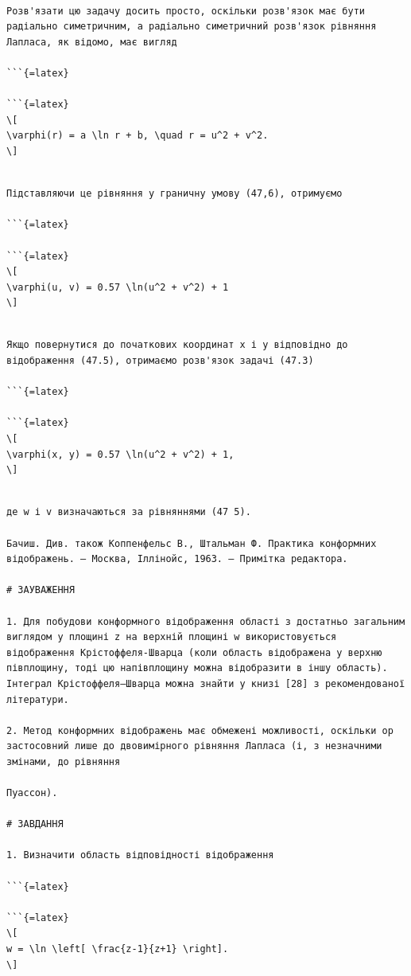 \documentclass[
]{article}
\begin{document}
\begin{verbatim}

Розв'язати цю задачу досить просто, оскільки розв'язок має бути радіально симетричним, а радіально симетричний розв'язок рівняння Лапласа, як відомо, має вигляд

```{=latex}

```{=latex}
\[
\varphi(r) = a \ln r + b, \quad r = u^2 + v^2.
\]
\end{verbatim}

\begin{verbatim}

Підставляючи це рівняння у граничну умову (47,6), отримуємо

```{=latex}

```{=latex}
\[
\varphi(u, v) = 0.57 \ln(u^2 + v^2) + 1
\]
\end{verbatim}

\begin{verbatim}

Якщо повернутися до початкових координат x і y відповідно до відображення (47.5), отримаємо розв'язок задачі (47.3)

```{=latex}

```{=latex}
\[
\varphi(x, y) = 0.57 \ln(u^2 + v^2) + 1,
\]
\end{verbatim}

\begin{verbatim}

де w і v визначаються за рівняннями (47 5).

Бачиш. Див. також Коппенфельс В., Штальман Ф. Практика конформних відображень. — Москва, Іллінойс, 1963. — Примітка редактора.

# ЗАУВАЖЕННЯ

1. Для побудови конформного відображення області з достатньо загальним виглядом у площині z на верхній площині w використовується відображення Крістоффеля-Шварца (коли область відображена у верхню півплощину, тоді цю напівплощину можна відобразити в іншу область). Інтеграл Крістоффеля–Шварца можна знайти у книзі [28] з рекомендованої літератури.

2. Метод конформних відображень має обмежені можливості, оскільки op застосовний лише до двовимірного рівняння Лапласа (і, з незначними змінами, до рівняння

Пуассон).

# ЗАВДАННЯ

1. Визначити область відповідності відображення

```{=latex}

```{=latex}
\[
w = \ln \left[ \frac{z-1}{z+1} \right].
\]
\end{verbatim}
\end{document}
